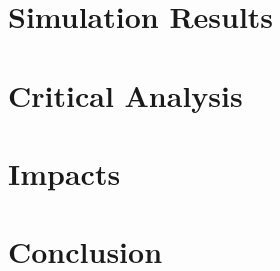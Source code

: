 \documentclass[pdftex,11pt,a4paper]{article}
\begin{document}
\section{Simulation Results}
\section{Critical Analysis}

\section{Impacts}

\section{Conclusion}
\newpage


\end{document}
